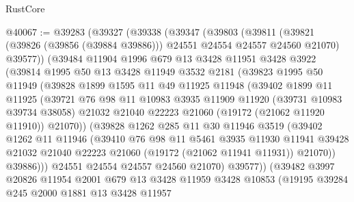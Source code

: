 \begin{lexlean}{RustCore}
\begin{coremodule}
@40067 := @39283
    (@39327
      (@39338
        (@39347
          (@39803
            (@39811
              (@39821 (@39826 (@39856 (@39884 @39886))) @24551 @24554 @24557 @24560 @21070)
              @39577))
          (@39484
            @11904
            @1996
            @679
            @13
            @3428
            @11951
            @3428
            @3922
            (@39814
              @1995
              @50
              @13
              @3428
              @11949
              @3532
              @2181
              (@39823
                @1995
                @50
                @11949
                (@39828
                  @1899
                  @1595
                  @11
                  @49
                  @11925
                  @11948
                  (@39402
                    @1899
                    @11
                    @11925
                    (@39721
                      @76
                      @98
                      @11
                      @10983
                      @3935
                      @11909
                      @11920
                      (@39731 @10983 @39734 @38058)
                      @21032
                      @21040
                      @22223
                      @21060
                      (@19172 (@21062 @11920 @11910))
                      @21070))
                  (@39828
                    @1262
                    @285
                    @11
                    @30
                    @11946
                    @3519
                    (@39402
                      @1262
                      @11
                      @11946
                      (@39410
                        @76
                        @98
                        @11
                        @5461
                        @3935
                        @11930
                        @11941
                        @39428
                        @21032
                        @21040
                        @22223
                        @21060
                        (@19172 (@21062 @11941 @11931))
                        @21070))
                    @39886)))
              @24551
              @24554
              @24557
              @24560
              @21070)
            @39577))
        (@39482
          @3997
          @20826
          @11954
          @2001
          @679
          @13
          @3428
          @11959
          @3428
          @10853
          (@19195
            @39284
            @245
            @2000
            @1881
            @13
            @3428
            @11957

\end{coremodule}
\end{lexlean}
